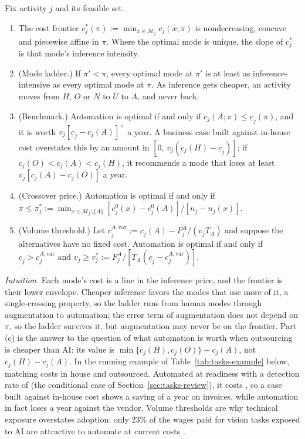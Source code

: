 \begin{proposition}\label{prop:tasks-modes}
Fix activity $j$ and its feasible set.
\begin{enumerate}
\item[(a)] The cost frontier $c^*_j(\pi):=\min_{x\in\mathcal M_j}c_j(x;\pi)$ is nondecreasing, concave and piecewise affine in $\pi$. Where the optimal mode is unique, the slope of $c^*_j$ is that mode's inference intensity.
\item[(b)] (Mode ladder.) If $\pi'<\pi$, every optimal mode at $\pi'$ is at least as inference-intensive as every optimal mode at $\pi$. As inference gets cheaper, an activity moves from $H$, $O$ or $N$ to $U$ to $A$, and never back.
\item[(c)] (Benchmark.) Automation is optimal if and only if $c_j(A;\pi)\le\underline c_j(\pi)$, and it is worth $v_j[\underline c_j-c_j(A)]^+$ a year. A business case built against in-house cost overstates this by an amount in $[0,\,v_j(c_j(H)-\underline c_j)]$; if $c_j(O)<c_j(A)<c_j(H)$, it recommends a mode that loses at least $v_j[c_j(A)-c_j(O)]$ a year.
\item[(d)] (Crossover price.) Automation is optimal if and only if $\pi\le\pi^*_j:=\min_{x\in\mathcal M_j\setminus\{A\}}[c^0_j(x)-c^0_j(A)]/[n_j-n_j(x)]$.
\item[(e)] (Volume threshold.) Let $c^{A,\mathrm{var}}_j:=c_j(A)-F^A_j/(v_jT_A)$ and suppose the alternatives have no fixed cost. Automation is optimal if and only if $\underline c_j>c^{A,\mathrm{var}}_j$ and $v_j\ge v^*_j:=F^A_j/[T_A(\underline c_j-c^{A,\mathrm{var}}_j)]$.
\end{enumerate}
\end{proposition}

\noindent\emph{Intuition.} Each mode's cost is a line in the inference price, and the frontier is their lower envelope. Cheaper inference favors the modes that use more of it, a single-crossing property, so the ladder runs from human modes through augmentation to automation; the error term of augmentation does not depend on $\pi$, so the ladder survives it, but augmentation may never be on the frontier. Part (c) is the answer to the question of what automation is worth when outsourcing is cheaper than AI: its value is $\min\{c_j(H),c_j(O)\}-c_j(A)$, not $c_j(H)-c_j(A)$. In the running example of Table~\ref{tab:tasks-example} below, matching costs \icMatchH{} in house and \icMatchO{} outsourced. Automated at readiness \icIotaHigh{} with a detection rate of \icDill{} (the conditional case of Section~\ref{sec:tasks-review}), it costs \icMatchA, so a case built against in-house cost shows a saving of \icMatchVsH{} a year on \icVolume{} invoices, while automation in fact loses \icMatchVsO{} a year against the vendor. Volume thresholds are why technical exposure overstates adoption: only 23\% of the wages paid for vision tasks exposed to AI are attractive to automate at current costs \citep{svanberg2024beyond}.

